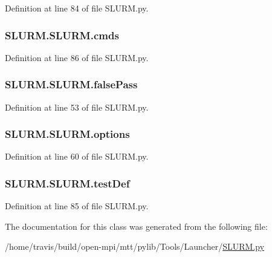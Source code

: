 Definition at line 84 of file S\-L\-U\-R\-M.\-py.

\hypertarget{class_s_l_u_r_m_1_1_s_l_u_r_m_ab755a940fd09c8fa416c177f692d31d6}{
\subsubsection[{cmds}]{\setlength{\rightskip}{0pt plus 5cm}S\-L\-U\-R\-M.\-S\-L\-U\-R\-M.\-cmds}}\label{class_s_l_u_r_m_1_1_s_l_u_r_m_ab755a940fd09c8fa416c177f692d31d6}


Definition at line 86 of file S\-L\-U\-R\-M.\-py.

\hypertarget{class_s_l_u_r_m_1_1_s_l_u_r_m_a1f7931833595fd42442787a7b8f6360f}{
\subsubsection[{false\-Pass}]{\setlength{\rightskip}{0pt plus 5cm}S\-L\-U\-R\-M.\-S\-L\-U\-R\-M.\-false\-Pass}}\label{class_s_l_u_r_m_1_1_s_l_u_r_m_a1f7931833595fd42442787a7b8f6360f}


Definition at line 53 of file S\-L\-U\-R\-M.\-py.

\hypertarget{class_s_l_u_r_m_1_1_s_l_u_r_m_a652a43986b8bda5c6ddb866ab0513ac8}{
\subsubsection[{options}]{\setlength{\rightskip}{0pt plus 5cm}S\-L\-U\-R\-M.\-S\-L\-U\-R\-M.\-options}}\label{class_s_l_u_r_m_1_1_s_l_u_r_m_a652a43986b8bda5c6ddb866ab0513ac8}


Definition at line 60 of file S\-L\-U\-R\-M.\-py.

\hypertarget{class_s_l_u_r_m_1_1_s_l_u_r_m_a9b08ef79e039a8524f1fa6712b45182b}{
\subsubsection[{test\-Def}]{\setlength{\rightskip}{0pt plus 5cm}S\-L\-U\-R\-M.\-S\-L\-U\-R\-M.\-test\-Def}}\label{class_s_l_u_r_m_1_1_s_l_u_r_m_a9b08ef79e039a8524f1fa6712b45182b}


Definition at line 85 of file S\-L\-U\-R\-M.\-py.



The documentation for this class was generated from the following file\-:\begin{DoxyCompactItemize}
\item 
/home/travis/build/open-\/mpi/mtt/pylib/\-Tools/\-Launcher/\hyperlink{_s_l_u_r_m_8py}{S\-L\-U\-R\-M.\-py}\end{DoxyCompactItemize}
